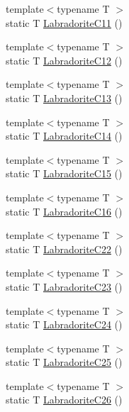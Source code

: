 \begin{DoxyCompactItemize}
\item 
{\footnotesize template$<$typename T $>$ }\\static T \mbox{\hyperlink{namespacempc_1_1data_a43b3d37ddf49a91a3dac3db51e98f098}{Labradorite\+C11}} ()
\item 
{\footnotesize template$<$typename T $>$ }\\static T \mbox{\hyperlink{namespacempc_1_1data_adf101e117504cfe59b7a705ac26e662b}{Labradorite\+C12}} ()
\item 
{\footnotesize template$<$typename T $>$ }\\static T \mbox{\hyperlink{namespacempc_1_1data_a35e490fa5bc1e66413cf4f6e76ef191e}{Labradorite\+C13}} ()
\item 
{\footnotesize template$<$typename T $>$ }\\static T \mbox{\hyperlink{namespacempc_1_1data_aed81645061326818a8cd40411834cf0e}{Labradorite\+C14}} ()
\item 
{\footnotesize template$<$typename T $>$ }\\static T \mbox{\hyperlink{namespacempc_1_1data_a9c735ddee053b30adeae7b71c1cfd62c}{Labradorite\+C15}} ()
\item 
{\footnotesize template$<$typename T $>$ }\\static T \mbox{\hyperlink{namespacempc_1_1data_a4adbd6259b0fd658eac112b57e5b040f}{Labradorite\+C16}} ()
\item 
{\footnotesize template$<$typename T $>$ }\\static T \mbox{\hyperlink{namespacempc_1_1data_ac37f839c636ecb232d1b43802ed31cf6}{Labradorite\+C22}} ()
\item 
{\footnotesize template$<$typename T $>$ }\\static T \mbox{\hyperlink{namespacempc_1_1data_ac60e4bb4b4758b2240b1113bf76794bb}{Labradorite\+C23}} ()
\item 
{\footnotesize template$<$typename T $>$ }\\static T \mbox{\hyperlink{namespacempc_1_1data_a6f771709b41195e6ca988999c8633554}{Labradorite\+C24}} ()
\item 
{\footnotesize template$<$typename T $>$ }\\static T \mbox{\hyperlink{namespacempc_1_1data_aca7a0a80d87a253995479187df2a1775}{Labradorite\+C25}} ()
\item 
{\footnotesize template$<$typename T $>$ }\\static T \mbox{\hyperlink{namespacempc_1_1data_a3b111f6de51ef868b7bd6bcb2a65f891}{Labradorite\+C26}} ()
\item 

\end{DoxyCompactItemize}
